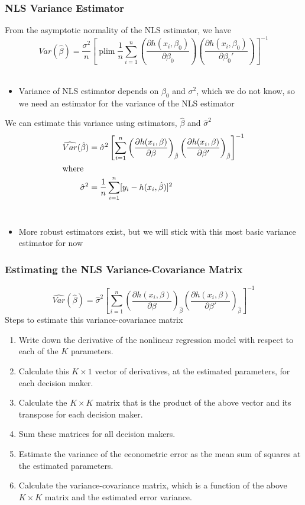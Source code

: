 \documentclass{beamer}
\DeclareMathOperator*{\plim}{plim}
\begin{document}
\begin{frame}\frametitle{NLS Variance Estimator}
    From the asymptotic normality of the NLS estimator, we have
    $$Var(\hat{\beta}) = \frac{\sigma^2}{n} \left[ \plim \frac{1}{n} \sum_{i = 1}^n \left( \frac{\partial h(x_i, \beta_0)}{\partial \beta_0} \right) \left( \frac{\partial h(x_i, \beta_0)}{\partial \beta_0'} \right) \right]^{-1}$$ \\
    \begin{itemize}
        \item Variance of NLS estimator depends on $\beta_0$ and $\sigma^2$, which we do not know, so we need an estimator for the variance of the NLS estimator
    \end{itemize}
    \vspace{1ex}
    We can estimate this variance using estimators, $\hat{\beta}$ and $\hat{\sigma}^2$
    \begin{align*}
    	\widehat{Var}(\hat{\beta}) &= \hat{\sigma}^2 \left[ \sum_{i = 1}^n \left( \frac{\partial h(x_i, \beta)}{\partial \beta} \right)_{\hat{\beta}} \left( \frac{\partial h(x_i, \beta)}{\partial \beta'} \right)_{\hat{\beta}} \right]^{-1} \\
    	\intertext{where}
    	\hat{\sigma}^2 &= \frac{1}{n} \sum_{i = 1}^n [y_i - h(x_i, \hat{\beta})]^2
    \end{align*} \\
    \begin{itemize}
    	\item More robust estimators exist, but we will stick with this most basic variance estimator for now
    \end{itemize}
\end{frame}

\begin{frame}\frametitle{Estimating the NLS Variance-Covariance Matrix}
    $$\widehat{Var}(\hat{\beta}) = \hat{\sigma}^2 \left[ \sum_{i = 1}^n \left( \frac{\partial h(x_i, \beta)}{\partial \beta} \right)_{\hat{\beta}} \left( \frac{\partial h(x_i, \beta)}{\partial \beta'} \right)_{\hat{\beta}} \right]^{-1}$$
    Steps to estimate this variance-covariance matrix
    \begin{enumerate}
		\item Write down the derivative of the nonlinear regression model with respect to each of the $K$ parameters.
		\item Calculate this $K \times 1$ vector of derivatives, at the estimated parameters, for each decision maker.
		\item Calculate the $K \times K$ matrix that is the product of the above vector and its transpose for each decision maker.
		\item Sum these matrices for all decision makers.
		\item Estimate the variance of the econometric error as the mean sum of squares at the estimated parameters.
		\item Calculate the variance-covariance matrix, which is a function of the above $K \times K$ matrix and the estimated error variance.
	\end{enumerate}
\end{frame}
\end{document}
